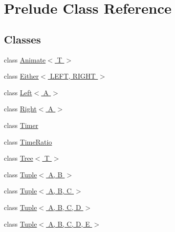 \hypertarget{class_prelude}{\section{Prelude Class Reference}
\label{class_prelude}
}
\subsection*{Classes}
\begin{DoxyCompactItemize}
\item 
class \hyperlink{class_prelude_1_1_animate_3_01_t_01_4}{Animate$<$ T $>$}
\item 
class \hyperlink{class_prelude_1_1_either_3_01_l_e_f_t_00_01_r_i_g_h_t_01_4}{Either$<$ L\+E\+F\+T, R\+I\+G\+H\+T $>$}
\item 
class \hyperlink{class_prelude_1_1_left_3_01_a_01_4}{Left$<$ A $>$}
\item 
class \hyperlink{class_prelude_1_1_right_3_01_a_01_4}{Right$<$ A $>$}
\item 
class \hyperlink{class_prelude_1_1_timer}{Timer}
\item 
class \hyperlink{class_prelude_1_1_time_ratio}{Time\+Ratio}
\item 
class \hyperlink{class_prelude_1_1_tree_3_01_t_01_4}{Tree$<$ T $>$}
\item 
class \hyperlink{class_prelude_1_1_tuple_3_01_a_00_01_b_01_4}{Tuple$<$ A, B $>$}
\item 
class \hyperlink{class_prelude_1_1_tuple_3_01_a_00_01_b_00_01_c_01_4}{Tuple$<$ A, B, C $>$}
\item 
class \hyperlink{class_prelude_1_1_tuple_3_01_a_00_01_b_00_01_c_00_01_d_01_4}{Tuple$<$ A, B, C, D $>$}
\item 
class \hyperlink{class_prelude_1_1_tuple_3_01_a_00_01_b_00_01_c_00_01_d_00_01_e_01_4}{Tuple$<$ A, B, C, D, E $>$}
\end{DoxyCompactItemize}
